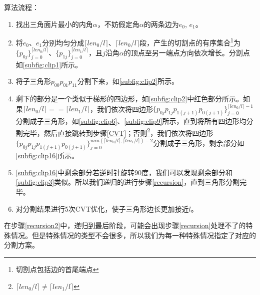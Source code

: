 算法流程：
\begin{enumerate}
    \item 找出三角面片最小的内角$\alpha$，不妨假定角$\alpha$的两条边为$e_0$, $e_1$。
    \item 将$e_0$、$e_1$分别均匀分成$\lceil len_0/l \rceil$、$\lceil len_0/l \rceil$段，产生的切割点的有序集合\footnote{切割点包括边的首尾端点}为$\{p_{0j}\}^{\lceil len_0/l \rceil}_{j=0}$、$\{p_{1j}\}^{\lceil len_1/l \rceil}_{j=0}$，且$j$沿角$\alpha$的顶点至另一端点方向依次增长。分割点如\autoref{subfig:clip1}所示。
    \item 将子三角形$p_{00}p_{01}p_{11}$分割下来，如\autoref{subfig:clip2}所示。
    \item 剩下的部分是一个类似于梯形的四边形，如\autoref{subfig:clip2}中红色部分所示。如果$\lceil len_0/l \rceil == \lceil len_1/l \rceil$，我们依次将四边形$\{p_{0j}p_{1j}p_{1(j+1)}p_{0(j+1)}\}^{\lceil len_0/l \rceil - 1}_{j=0}$分割成子三角形，如\autoref{subfig:clip6}、\autoref{subfig:clip9}所示，直到将所有四边形均分割完毕，然后直接跳转到步骤\ref{CVT}；否则\footnote{$\lceil len_0/l \rceil \ne \lceil len_1/l \rceil$}，我们依次将四边形$\{p_{0j}p_{1j}p_{1(j+1)}p_{0(j+1)}\}^{min(\lceil len_0/l \rceil, \lceil len_1/l \rceil) - 2}_{j=0}$分割成子三角形，剩余部分如\autoref{subfig:clip16}所示。\label{recursion}
    \item \autoref{subfig:clip16}中剩余部分若逆时针旋转90度，我们可以发现剩余部分和\autoref{subfig:clip3}类似。所以我们递归的进行步骤\ref{recursion}，直到三角形分割完毕。\label{recursion2}
    \item 对分割结果进行5次CVT优化，使子三角形边长更加接近$l$。\label{CVT}
\end{enumerate}

在步骤\ref{recursion2}中，递归到最后阶段，可能会出现步骤\ref{recursion}处理不了的特殊情况。但是特殊情况的类型不会很多，所以我们为每一种特殊情况指定了对应的分割方案。

